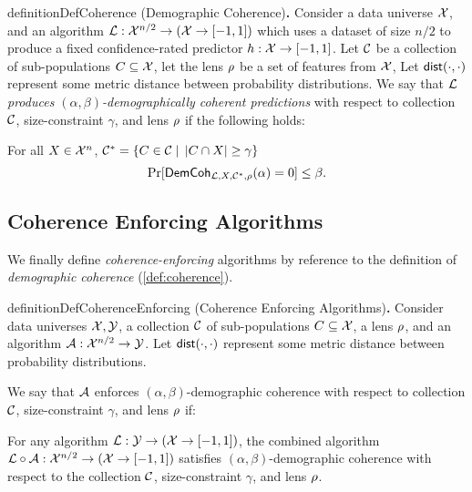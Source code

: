 \begin{itemize}[leftmargin=*,itemsep=0pt]
\begin{restatable}{definition}{DefCoherence}\label{def:coherence}
    {\normalfont(Demographic Coherence)\textbf{.}}
    Consider a data universe $\mathcal{X}$, and an algorithm $\mathcal{L}: \mathcal{X}^{n/2}\to (\mathcal{X} \to [-1,1])$ which uses a dataset of size $n/2$ to produce a fixed confidence-rated predictor $h: \mathcal{X} \to [-1,1]$. Let $\mathcal{C}$ be a collection of sub-populations $C \subseteq \mathcal{X}$, let the lens $\rho$ be a set of features from $\mathcal{X}$,  Let $\mathsf{dist}(\cdot,\cdot)$ represent some metric distance between probability distributions. 
    We say that \emph{$\mathcal{L}$ produces $(\alpha,\beta)$-demographically coherent predictions} with respect to collection $\mathcal{C}$, size-constraint $\gamma$, and lens $\rho$ if the following holds:

    \medskip\noindent 
    For all $X \in \mathcal{X}^n$, $\mathcal{C}^*= \{C\in\mathcal{C} \mid\, |C\cap X| \geq \gamma\}$
    \[\Pr[\mathsf{DemCoh}_{\mathcal{L},X,\mathcal{C}^*,\rho}(\alpha) = 0] \leq \beta.\]
\end{restatable}

\subsection{Coherence Enforcing Algorithms}\label{sec:def-coherence-enforcing}

We finally define \emph{coherence-enforcing} algorithms by reference to the definition of \emph{demographic coherence} (\cref{def:coherence}). 

\begin{restatable}{definition}{DefCoherenceEnforcing}\label{def:coherenceEnforcing}
    {\normalfont(Coherence Enforcing Algorithms)\textbf{.}}
    Consider data universes $\mathcal{X}, \mathcal{Y}$, a collection $\mathcal{C}$ of sub-populations $C \subseteq \mathcal{X}$, a lens $\rho$, and an algorithm $\mathcal{A}:\mathcal{X}^{n/2} \to \mathcal{Y}$. Let $\mathsf{dist}(\cdot,\cdot)$ represent some metric distance between probability distributions. 

    \medskip\noindent
    We say that $\mathcal{A}$ enforces $(\alpha,\beta)$-demographic coherence with respect to collection $\mathcal{C}$, size-constraint $\gamma$, and lens $\rho$ if:

    \medskip\noindent
    For any algorithm $\mathcal{L}:\mathcal{Y}\to(\mathcal{X}\to[-1,1])$, the combined algorithm $\mathcal{L}\circ\mathcal{A}:\mathcal{X}^{n/2} \to (\mathcal{X} \to [-1,1])$ satisfies $(\alpha,\beta)$-demographic coherence with respect to  the collection $\mathcal{C}$, size-constraint $\gamma$,  and lens $\rho$.
\end{restatable}


\end{itemize}
